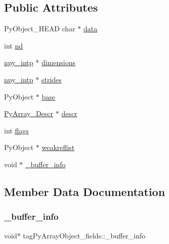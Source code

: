 \subsection*{Public Attributes}
\begin{DoxyCompactItemize}
\item 
Py\+Object\+\_\+\+H\+E\+AD char $\ast$ \hyperlink{structtagPyArrayObject__fields_aa49acb6d56cc2378034742fdfd866c8f}{data}
\item 
int \hyperlink{structtagPyArrayObject__fields_ad0b4e7b917da014b50323a873df4fbec}{nd}
\item 
\hyperlink{npy__common_8h_a2d6effc4d5ecb85675ebfcfaa102b483}{npy\+\_\+intp} $\ast$ \hyperlink{structtagPyArrayObject__fields_a536908cfe356253533bd967759ceaf7f}{dimensions}
\item 
\hyperlink{npy__common_8h_a2d6effc4d5ecb85675ebfcfaa102b483}{npy\+\_\+intp} $\ast$ \hyperlink{structtagPyArrayObject__fields_a34a411072ff42d04318fec79e80154fa}{strides}
\item 
Py\+Object $\ast$ \hyperlink{structtagPyArrayObject__fields_a2ce00e11f74d316112407c8b349ac154}{base}
\item 
\hyperlink{ndarraytypes_8h_a08fb2fb967ebbdd179e08d7b8756bd75}{Py\+Array\+\_\+\+Descr} $\ast$ \hyperlink{structtagPyArrayObject__fields_a10fab81b3eef3702628dee8a3b7d1fea}{descr}
\item 
int \hyperlink{structtagPyArrayObject__fields_a43821c110979d0cf3e04cff3761f2f63}{flags}
\item 
Py\+Object $\ast$ \hyperlink{structtagPyArrayObject__fields_a529706feb7e4b433ee8ecf4aaca694e6}{weakreflist}
\item 
void $\ast$ \hyperlink{structtagPyArrayObject__fields_a215b77f5b0c99764d03ff89fa5ce089d}{\+\_\+buffer\+\_\+info}
\end{DoxyCompactItemize}


\subsection{Member Data Documentation}
\mbox{\label{structtagPyArrayObject__fields_a215b77f5b0c99764d03ff89fa5ce089d}} 
\subsubsection{\texorpdfstring{\+\_\+buffer\+\_\+info}{\_buffer\_info}}
{\footnotesize\ttfamily void$\ast$ tag\+Py\+Array\+Object\+\_\+fields\+::\+\_\+buffer\+\_\+info}

